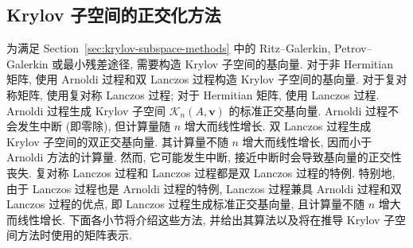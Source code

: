 \subsection{{Krylov 子空间的正交化方法}}\label{sec:krylov-orthogonalization}
{为满足 Section~\ref{sec:krylov-subspace-methods} 中的 Ritz--Galerkin, Petrov--Galerkin 或最小残差途径, 需要构造 \linebreak[4]Krylov 子空间的基向量. 对于非 Hermitian 矩阵, 使用 Arnoldi 过程和双 Lanczos 过程构造 Krylov 子空间的基向量. 对于复对称矩阵, 使用复对称 Lanczos 过程; 对于 Hermitian 矩阵, 使用 Lanczos 过程.}
{Arnoldi 过程生成 Krylov 子空间 $\mathcal K_n(A,\bm v)$ 的标准正交基向量. Arnoldi 过程不会发生中断 (即零除), 但计算量随 $n$ 增大而线性增长. 双 Lanczos 过程生成 Krylov 子空间的双正交基向量. 其计算量不随 $n$ 增大而线性增长, 因而小于 Arnoldi 方法的计算量. 然而, 它可能发生中断, 接近中断时会导致基向量的正交性丧失. 复对称 Lanczos 过程和 Lanczos 过程都是双 Lanczos 过程的特例. 特别地, 由于 Lanczos 过程也是 Arnoldi 过程的特例, Lanczos 过程兼具 Arnoldi 过程和双 Lanczos 过程的优点, 即 Lanczos 过程生成标准正交基向量, 且计算量不随 $n$ 增大而线性增长.}
{下面各小节将介绍这些方法, 并给出其算法以及将在推导 Krylov 子空间方法时使用的矩阵表示.}
